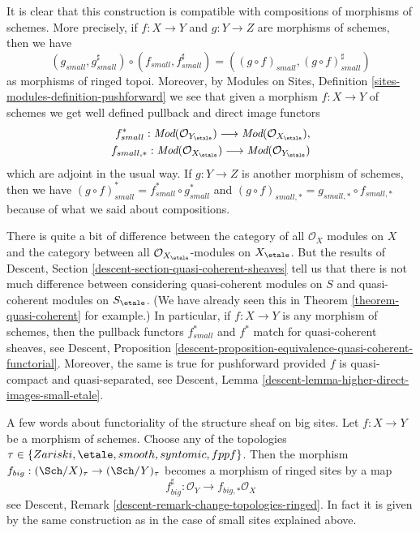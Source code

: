 \medskip\noindent
It is clear that this construction is compatible with compositions of
morphisms of schemes. More precisely, if $f : X \to Y$ and $g : Y \to Z$
are morphisms of schemes, then we have
$$
(g_{small}, g_{small}^\sharp)
\circ
(f_{small}, f_{small}^\sharp)
=
((g \circ f)_{small}, (g \circ f)_{small}^\sharp)
$$
as morphisms of ringed topoi. Moreover, by
Modules on Sites, Definition \ref{sites-modules-definition-pushforward}
we see that given a morphism $f : X \to Y$ of schemes
we get well defined pullback and direct image functors
\begin{align*}
f_{small}^* :
\textit{Mod}(\mathcal{O}_{Y_\etale})
\longrightarrow
\textit{Mod}(\mathcal{O}_{X_\etale}), \\
f_{small, *} :
\textit{Mod}(\mathcal{O}_{X_\etale})
\longrightarrow
\textit{Mod}(\mathcal{O}_{Y_\etale})
\end{align*}
which are adjoint in the usual way. If $g : Y \to Z$ is another morphism
of schemes, then we have
$(g \circ f)_{small}^* = f_{small}^* \circ g_{small}^*$
and $(g \circ f)_{small, *} = g_{small, *} \circ f_{small, *}$
because of what we said about compositions.

\medskip\noindent
There is quite a bit of difference between the category
of all $\mathcal{O}_X$ modules on $X$ and the category between all
$\mathcal{O}_{X_\etale}$-modules on $X_\etale$. But the
results of
Descent, Section \ref{descent-section-quasi-coherent-sheaves}
tell us that there is not much difference between considering quasi-coherent
modules on $S$ and quasi-coherent modules on $S_\etale$.
(We have already seen this in
Theorem \ref{theorem-quasi-coherent}
for example.)
In particular, if $f : X \to Y$ is any morphism of schemes, then
the pullback functors $f_{small}^*$ and $f^*$ match for
quasi-coherent sheaves, see
Descent,
Proposition \ref{descent-proposition-equivalence-quasi-coherent-functorial}.
Moreover, the same is true for pushforward provided $f$ is
quasi-compact and quasi-separated, see
Descent, Lemma \ref{descent-lemma-higher-direct-images-small-etale}.

\medskip\noindent
A few words about functoriality of the structure sheaf on big sites.
Let $f : X \to Y$ be a morphism of schemes. Choose any of the
topologies $\tau \in \{Zariski,\linebreak[0]
\etale,\linebreak[0] smooth,\linebreak[0] syntomic,\linebreak[0]
fppf\}$. Then the morphism
$f_{big} : (\Sch/X)_\tau \to (\Sch/Y)_\tau$
becomes a morphism of ringed sites by a map
$$
f_{big}^\sharp : \mathcal{O}_Y \longrightarrow f_{big, *}\mathcal{O}_X
$$
see Descent, Remark \ref{descent-remark-change-topologies-ringed}.
In fact it is given by the same construction as in the case of small
sites explained above.








